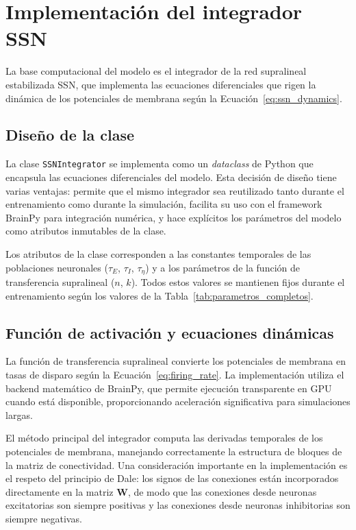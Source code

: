 
\section{Implementación del integrador SSN}
\label{sec:impl_ssn}

La base computacional del modelo es el integrador de la red supralineal estabilizada \acrshort{SSN}, que implementa las ecuaciones diferenciales que rigen la dinámica de los potenciales de membrana según la Ecuación~\ref{eq:ssn_dynamics}.

\subsection{Diseño de la clase}
\label{subsec:impl_ssn_integrador}

La clase \texttt{SSNIntegrator} se implementa como un \textit{dataclass} de Python que encapsula las ecuaciones diferenciales del modelo. Esta decisión de diseño tiene varias ventajas: permite que el mismo integrador sea reutilizado tanto durante el entrenamiento como durante la simulación, facilita su uso con el framework BrainPy para integración numérica, y hace explícitos los parámetros del modelo como atributos inmutables de la clase.

Los atributos de la clase corresponden a las constantes temporales de las poblaciones neuronales ($\tau_E$, $\tau_I$, $\tau_\eta$) y a los parámetros de la función de transferencia supralineal ($n$, $k$). Todos estos valores se mantienen fijos durante el entrenamiento según los valores de la Tabla~\ref{tab:parametros_completos}.

\subsection{Función de activación y ecuaciones dinámicas}
\label{subsec:impl_ssn_dynamics}

La función de transferencia supralineal convierte los potenciales de membrana en tasas de disparo según la Ecuación~\ref{eq:firing_rate}. La implementación utiliza el backend matemático de BrainPy, que permite ejecución transparente en GPU cuando está disponible, proporcionando aceleración significativa para simulaciones largas.

El método principal del integrador computa las derivadas temporales de los potenciales de membrana, manejando correctamente la estructura de bloques de la matriz de conectividad. Una consideración importante en la implementación es el respeto del principio de Dale: los signos de las conexiones están incorporados directamente en la matriz $\mathbf{W}$, de modo que las conexiones desde neuronas excitatorias son siempre positivas y las conexiones desde neuronas inhibitorias son siempre negativas.

